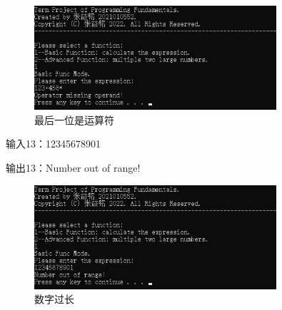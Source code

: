 \documentclass[a4paper, 11pt, UTF8]{ctexart}
\begin{document}
\begin{figure}[H]
    \centering
    \caption{最后一位是运算符}
    \includegraphics[width=0.8\textwidth]{t12.png}
\end{figure}

输入13：12345678901

输出13：Number out of range!

\begin{figure}[H]
    \centering
    \caption{数字过长}
    \includegraphics[width=0.8\textwidth]{t13.png}
\end{figure}
\end{document}
